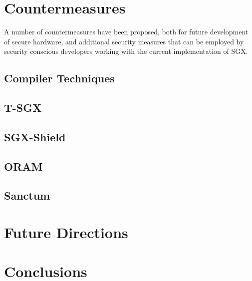 \section{Countermeasures}

A number of countermeasures have been proposed, both for future development of secure hardware, and additional security measures that can be employed by security conscious developers working with the current implementation of SGX.

\subsection{Compiler Techniques}


\subsection{T-SGX}

\subsection{SGX-Shield}

\subsection{ORAM}

\subsection{Sanctum}

\section{Future Directions}

\section{Conclusions}
